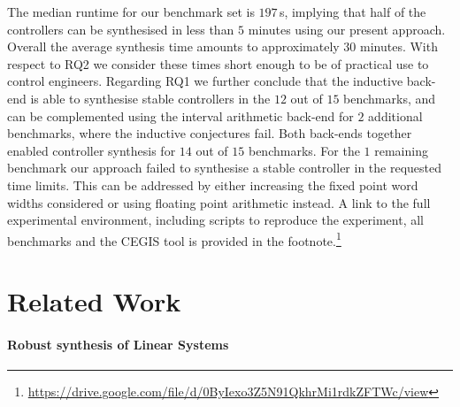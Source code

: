 \documentclass{sig-alternate-05-2015}
\begin{document}
The median runtime for our benchmark set is $197$\,s, implying that half of the controllers
can be synthesised in less than $5$ minutes using our present approach. Overall the average synthesis
time amounts to approximately $30$ minutes. With respect to RQ2 we consider
these times short enough to be of practical use to control engineers.
Regarding RQ1 we further conclude that the inductive back-end is able to synthesise 
stable controllers in the $12$ out of $15$ benchmarks, and can be complemented using 
the interval arithmetic back-end for $2$ additional benchmarks, where the inductive 
conjectures fail. Both back-ends together enabled controller synthesis for $14$ 
out of $15$ benchmarks.  For the $1$ remaining benchmark our approach failed to synthesise
a stable controller in the requested time limits. This can be addressed by either increasing
the fixed point word widths considered or using floating point arithmetic instead. A link
to the full experimental environment, including scripts to reproduce the experiment, all
benchmarks and the CEGIS tool is provided in the footnote.\footnote{\url{https://drive.google.com/file/d/0ByIexo3Z5N91QkhrMi1rdkZFTWc/view}}

\section{Related Work}

\paragraph{Robust synthesis of Linear Systems} 
\end{document}
